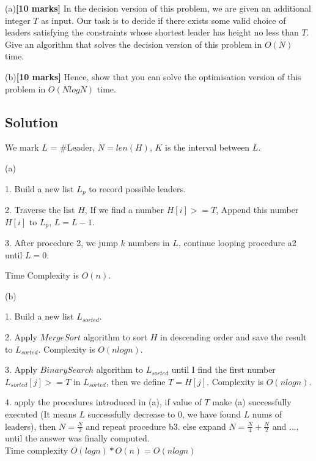 \documentclass[a4paper,12pt]{article}
\begin{document}
(a)\textbf{[10 marks]} In the decision version of this problem, we are given an additional  integer $T$ as input. Our task is to decide if there exists some valid choice of leaders satisfying the constraints whose shortest leader has height no less than $T$. Give an algorithm that solves the decision version of this problem in $O(N)$ time.

(b)\textbf{[10 marks]} Hence, show that you can solve the optimisation version of this problem in $O(NlogN)$ time.

\subsection*{Solution}
\setlength{\parindent}{0pt} %

We mark $L$ = \#Leader, $N = len(H)$, $K$ is the interval between $L$.

(a)

1. Build a new list $L_p$ to record possible leaders. 

2. Traverse the list $H$, If we find a number $H[i] >= T$, Append this number $H[i]$ to $L_p$, $L = L - 1$.

3. After procedure 2, we jump $k$ numbers in $L$, continue looping procedure a2 until $L = 0$.

Time Complexity is $O(n)$.

(b)

1. Build a new list $L_{sorted}$.

2. Apply $MergeSort$ algorithm to sort $H$ in descending order and save the result to $L_{sorted}$. Complexity is $O(nlogn)$.

3. Apply $BinarySearch$ algorithm to $L_{sorted}$ until I find the first number $L_{sorted}[j] >= T$ in $L_{sorted}$, then we define $T = H[j]$. Complexity is $O(nlogn)$.

4. apply the procedures introduced in (a), if value of $T$ make (a) successfully executed (It means $L$ successfully decrease to 0, we have found $L$ nums of leaders), then $N = \frac{N}{2}$ and repeat procedure b3. else expand $N = \frac{N}{4} + \frac{N}{2}$ and ..., until the answer was finally computed.\\

Time complexity $O(logn)*O(n) = O(nlogn)$



\end{document}
